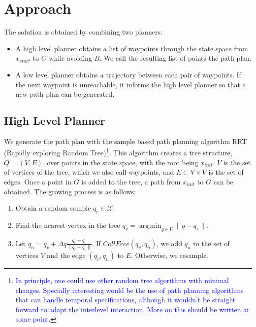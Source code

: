 \documentclass[12pt]{article}
\DeclareMathOperator*{\argmin}{arg\,min}
\newcommand\fran[1]{\textcolor{blue}{#1}}
\newcommand\ffran[1]{\textcolor{blue}{\footnote{\fran{#1}}}}
\begin{document}
\section{Approach}
\label{sec:approach}

The solution is obtained by combining two planners:

\begin{itemize}
    \item A high level planner obtains a list of waypoints through the state space from $x_{start}$ to $G$ while avoiding $B$. We call the resulting list of points the path plan.
    \item A low level planner obtains a trajectory between each pair of waypoints. If the next waypoint is unreachable, it informs the high level planner so that a new path plan can be generated.
\end{itemize}

\subsection{High Level Planner}
\label{sub:high_level_planner}

We generate the path plan with the sample based path planning algorithm RRT (Rapidly exploring Random Tree)\ffran{In principle, one could use other random tree algorithms with minimal changes. Specially interesting would be the use of path planning algorithms that can handle temporal specifications, although it wouldn't be straight forward to adapt the interlevel interaction. More on this should be written at some point.}. This algorithm creates a tree structure, $Q = (V, E)$, over points in the state space, with the root being $x_{init}$. $V$ is the set of vertices of the tree, which we also call waypoints, and $E \subset V \times V$ is the set of edges. Once a point in $G$ is added to the tree, a path from $x_{init}$ to $G$ can be obtained. The growing process is as follows:

\begin{enumerate}
    \item Obtain a random sample $q_r \in \mathcal{X}$.
    \item Find the nearest vertex in the tree $q_v = \argmin_{q \in V} \|q - q_r\|$.
    \item Let $q_n = q_v + \Delta q \frac{q_r - q_v}{\|q_r - q_v\|}$. If $CollFree(q_v, q_n)$, we add $q_n$ to the set of vertices $V$ and the edge $(q_v, q_n)$ to $E$. Otherwise, we resample.
\end{enumerate}
\end{document}
